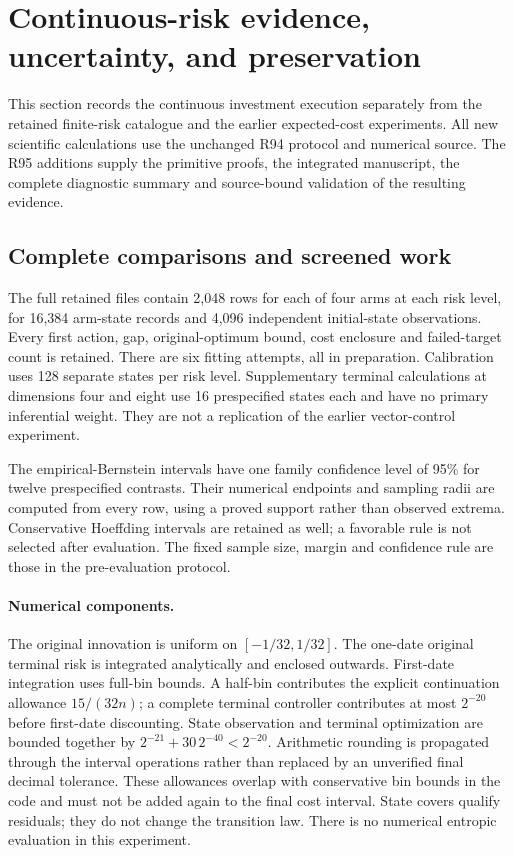 \section{Continuous-risk evidence, uncertainty, and preservation}\label{sec:evidence95}
This section records the continuous investment execution separately from the retained finite-risk catalogue and the earlier expected-cost experiments. All new scientific calculations use the unchanged R94 protocol and numerical source. The R95 additions supply the primitive proofs, the integrated manuscript, the complete diagnostic summary and source-bound validation of the resulting evidence.

\subsection{Complete comparisons and screened work}


The full retained files contain 2,048 rows for each of four arms at each risk level, for 16,384 arm-state records and 4,096 independent initial-state observations. Every first action, gap, original-optimum bound, cost enclosure and failed-target count is retained. There are six fitting attempts, all in preparation. Calibration uses 128 separate states per risk level. Supplementary terminal calculations at dimensions four and eight use 16 prespecified states each and have no primary inferential weight. They are not a replication of the earlier vector-control experiment.

The empirical-Bernstein intervals have one family confidence level of 95\% for twelve prespecified contrasts. Their numerical endpoints and sampling radii are computed from every row, using a proved support rather than observed extrema. Conservative Hoeffding intervals are retained as well; a favorable rule is not selected after evaluation. The fixed sample size, margin and confidence rule are those in the pre-evaluation protocol.

\paragraph{Numerical components.}
The original innovation is uniform on $[-1/32,1/32]$. The one-date original terminal risk is integrated analytically and enclosed outwards. First-date integration uses full-bin bounds. A half-bin contributes the explicit continuation allowance $15/(32n)$; a complete terminal controller contributes at most $2^{-20}$ before first-date discounting. State observation and terminal optimization are bounded together by $2^{-21}+30\,2^{-40}<2^{-20}$. Arithmetic rounding is propagated through the interval operations rather than replaced by an unverified final decimal tolerance. These allowances overlap with conservative bin bounds in the code and must not be added again to the final cost interval. State covers qualify residuals; they do not change the transition law. There is no numerical entropic evaluation in this experiment.

